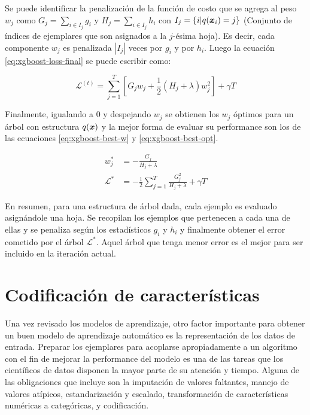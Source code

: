 Se puede identificar la penalización de la función de costo que se agrega al
peso $w_j$ como $G_{j} = \sum_{i \in I_j} g_i$ y $H_j = \sum_{i \in I_j} h_i$
con $I_j = \{i | q(\boldsymbol{x}_i) = j\}$ (Conjunto de índices de ejemplares que son
asignados a la $j$-ésima hoja). Es decir, cada componente $w_j$ es penalizada
$|I_{j}|$ veces por $g_i$ y por $h_i$. Luego la ecuación
\ref{eq:xgboost-loss-final} se puede escribir como:

\begin{equation}
    \mathcal{L}^{(t)} = \sum_{j = 1}^{T}[G_j w_j + \frac{1}{2} (H_j + \lambda)w_j^2] + \gamma T
\end{equation}

Finalmente, igualando a $0$ y despejando $w_j$ se obtienen los $w_j$ óptimos
para un árbol con estructura $q(\boldsymbol{x})$ y la mejor forma de evaluar su
performance son los de las ecuaciones \ref{eq:xgboost-best-w} y
\ref{eq:xgboost-best-opt}.

\begin{align}
    w_{j}^{*} &= - \frac{G_j}{H_j + \lambda} \label{eq:xgboost-best-w}\\
    \mathcal{L}^{*} &= -\frac{1}{2} \sum_{j=1}^{T} \frac{G_{j}^{2}}{H_j + \lambda} + \gamma T \label{eq:xgboost-best-opt}
\end{align}

En resumen, para una estructura de árbol dada, cada ejemplo es evaluado
asignándole una hoja. Se recopilan los ejemplos que pertenecen a cada una de
ellas y se penaliza según los estadísticos $g_i$ y $h_i$ y finalmente obtener el
error cometido por el árbol $\mathcal{L^{*}}$. Aquel árbol que tenga menor error
es el mejor para ser incluido en la iteración actual.

\section{Codificación de características}

Una vez revisado los modelos de aprendizaje, otro factor importante para obtener
un buen modelo de aprendizaje automático es la representación de los datos de
entrada. Preparar los ejemplares para acoplarse apropiadamente a un algoritmo
con el fin de mejorar la performance del modelo es una de las tareas que
los científicos de datos disponen la mayor parte de su atención y tiempo. Alguna
de las obligaciones que incluye son la imputación de valores faltantes, manejo
de valores atípicos, estandarización y escalado, transformación de
características numéricas a categóricas, y codificación.

